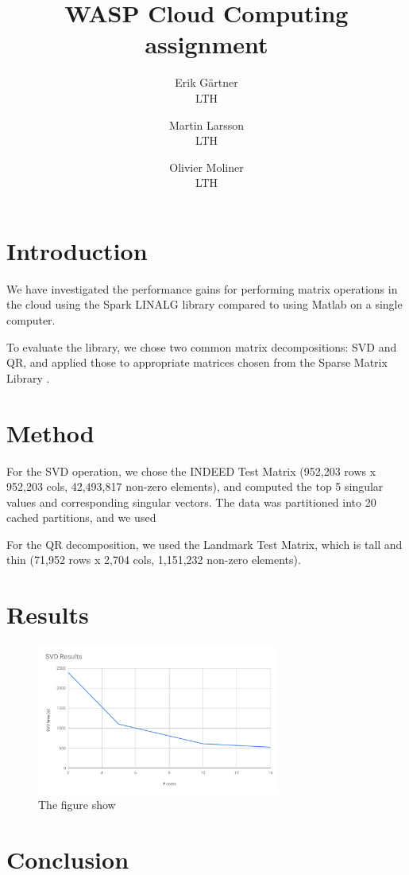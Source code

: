 \documentclass[a4paper]{article}
\title{WASP Cloud Computing assignment}
\author{
Erik Gärtner \\ LTH
\and
Martin Larsson \\ LTH
\and
Olivier Moliner \\ LTH}
\begin{document}
\maketitle

\section{Introduction}

We have investigated the performance gains for performing matrix operations in the cloud using the Spark LINALG library compared to using Matlab on a single computer.

To evaluate the library, we chose two common matrix decompositions: SVD and QR, and applied those to appropriate matrices chosen from the Sparse Matrix Library \cite{???}.

\section{Method}

For the SVD operation, we chose the INDEED Test Matrix (952,203 rows x 952,203 cols, 42,493,817 non-zero elements), and computed the top 5 singular values and corresponding singular vectors. The data was partitioned into 20 cached partitions, and we used 


For the QR decomposition, we used the Landmark Test Matrix, which is tall and thin (71,952 rows x 2,704 cols, 1,151,232 non-zero elements).


\section{Results}

\begin{figure}[!htbp]
\begin{center}
\includegraphics[width=8cm]{SVD Results.pdf}
\end{center}
\caption{The figure show}\label{svd}
\end{figure}

\section{Conclusion}
\end{document}
